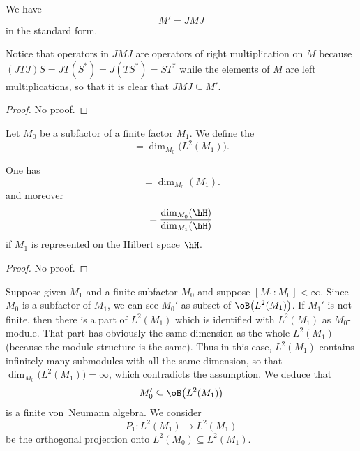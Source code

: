 \begin{lemma}
We have
\begin{equation}
	M'=JMJ
\end{equation}
in the standard form.
\end{lemma}
Notice that operators in $JMJ$ are operators of right multiplication on $M$ because $(JTJ)S=JT(S^*)=J(TS^*)=ST^*$ while the elements of $M$ are left multiplications, so that it is clear that $JMJ\subseteq M'$.

\begin{proof}
No proof.
\end{proof}

Let $M_0$ be a subfactor of a finite factor $M_1$. We define the 
\begin{equation}
	[M_1:M_0]=\dim_{M_0}\big( L^2(M_1) \big).
\end{equation}

\begin{theorem}
One has
\begin{equation}
	[M_1:M_0]=\dim_{M_0}(M_1).
\end{equation}
and moreover
\begin{equation}
	[M_1:M_0]=\frac{ \dim_{M_0}(\hH) }{   \dim_{M_1}(\hH) }
\end{equation}
 if $M_1$ is represented on the Hilbert space $\hH$.
\end{theorem}
\begin{proof}
No proof.
\end{proof}

Suppose given $M_1$ and a finite subfactor $M_0$ and suppose $[M_1:M_0]<\infty$. Since $M_0$ is a subfactor of $M_1$, we can see $M_0'$ as subset of $\oB\big( L^2(M_1) \big)$. If $M_1'$ is not finite, then there is a part of $L^2(M_1)$ which is identified with $L^2(M_1)$ as $M_0$-module. That part has obviously the same dimension as the whole $L^2(M_1)$ (because the module structure is the same). Thus in this case, $L^2(M_1)$ contains infinitely many submodules with all the same dimension, so that $\dim_{M_0}\big( L^2(M_1) \big)=\infty$, which contradicts the assumption. We deduce that
\begin{equation}
	M_0'\subseteq\oB\big( L^2(M_1) \big)
\end{equation}
is a finite von~Neumann algebra. We consider
\begin{equation}
	P_1\colon L^2(M_1)\to L^2(M_1)
\end{equation}
be the orthogonal projection onto $L^2(M_0)\subseteq L^2(M_1)$.


